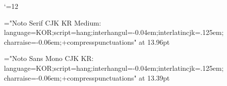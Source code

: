 \def\tenmath{\tenpoint\fam-1 } %
\def\tenbig#1{{\hbox{$\left#1\vbox to8.5pt{}\right.\n@space$}}}
\def\ninebig#1{{\hbox{$\textfont0=\tenrm\textfont2=\tensy
  \left#1\vbox to7.25pt{}\right.\n@space$}}}
\def\eightbig#1{{\hbox{$\textfont0=\ninermfont\textfont2=\ninesy
  \left#1\vbox to6.5pt{}\right.\n@space$}}}

\catcode`\@=12
\tenpoint

\def\eightrm{\eightrmfont\eightmj} %
\def\ninerm{\ninermfont\ninemj}
\def\mc{\ninerm}                   %
\def\sc{\eightrm}                  %
\def\mainfont{\tenrm\tenmj}        %
\def\cmntfont{\tenrm\tenmj}        %
\def\smallfont{\eightrm}           %

\let\latintitlefont=\titlefont
\sethangulfont\hangultitlefont="Noto Serif CJK KR Medium:%
  language=KOR;script=hang;interhangul=-0.04em;interlatincjk=.125em;%
  charraise=-0.06em;+compresspunctuations" at 13.96pt
\def\titlefont{\latintitlefont\hangultitlefont}

\let\latinttitlefont=\ttitlefont
\sethangulfont\hangulttitlefont="Noto Sans Mono CJK KR:%
  language=KOR;script=hang;interhangul=-0.04em;interlatincjk=.125em;%
  charraise=-0.06em;+compresspunctuations" at 13.39pt
\def\ttitlefont{\latinttitlefont\hangulttitlefont}

\let\ttdot=\.
\def\.{\leavevmode\kottdot}
\def\kottdot#1{{\tentz\ttdot{#1}}}

